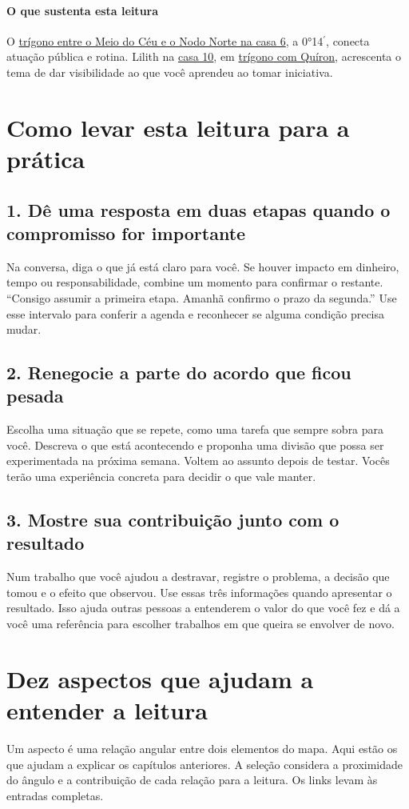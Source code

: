 \documentclass[11pt,a4paper]{article}
\begin{document}
\paragraph*{O que sustenta esta leitura} O \hyperref[aspecto:mc-nodo]{trígono entre o Meio do Céu e o Nodo Norte na casa 6}, a 0°14\ensuremath{^{\prime}}, conecta atuação pública e rotina. Lilith na \hyperref[casa-10]{casa 10}, em \hyperref[aspecto:lilith-quiron]{trígono com Quíron}, acrescenta o tema de dar visibilidade ao que você aprendeu ao tomar iniciativa.
\clearpage
\section{Como levar esta leitura para a prática}

\subsection*{1. Dê uma resposta em duas etapas quando o compromisso for importante}
Na conversa, diga o que já está claro para você. Se houver impacto em dinheiro, tempo ou responsabilidade, combine um momento para confirmar o restante. “Consigo assumir a primeira etapa. Amanhã confirmo o prazo da segunda.” Use esse intervalo para conferir a agenda e reconhecer se alguma condição precisa mudar.

\subsection*{2. Renegocie a parte do acordo que ficou pesada}
Escolha uma situação que se repete, como uma tarefa que sempre sobra para você. Descreva o que está acontecendo e proponha uma divisão que possa ser experimentada na próxima semana. Voltem ao assunto depois de testar. Vocês terão uma experiência concreta para decidir o que vale manter.

\subsection*{3. Mostre sua contribuição junto com o resultado}
Num trabalho que você ajudou a destravar, registre o problema, a decisão que tomou e o efeito que observou. Use essas três informações quando apresentar o resultado. Isso ajuda outras pessoas a entenderem o valor do que você fez e dá a você uma referência para escolher trabalhos em que queira se envolver de novo.

\clearpage

\section{Dez aspectos que ajudam a entender a leitura}
Um aspecto é uma relação angular entre dois elementos do mapa. Aqui estão os que ajudam a explicar os capítulos anteriores. A seleção considera a proximidade do ângulo e a contribuição de cada relação para a leitura. Os links levam às entradas completas.
\end{document}
